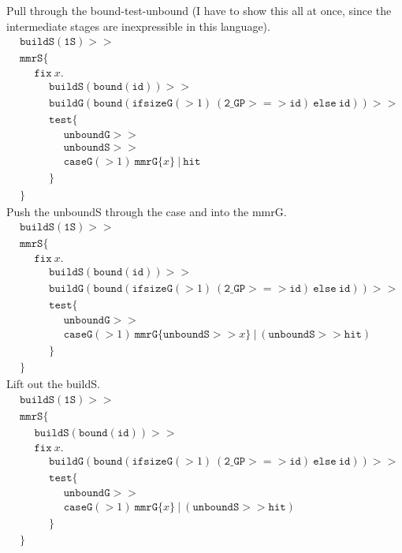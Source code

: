 \documentclass{article}
\newcommand {\fix}{\mathtt{fix}}
\newcommand {\test}{\mathtt{test}}
\newcommand {\isect}{\mathtt{hit}}
\newcommand {\buildG}{\mathtt{buildG}}
\newcommand {\buildS}{\mathtt{buildS}}
\newcommand {\id}{\mathtt{id}}
\newcommand {\unboundG}{\mathtt{unboundG}}
\newcommand {\unboundS}{\mathtt{unboundS}}
\newcommand {\mmrG}{\mathtt{mmrG}}
\newcommand {\mmrS}{\mathtt{mmrS}}
\newcommand {\oneS}{\mathtt{1S}}
\newcommand {\twoGP}{\mathtt{2\_GP}}
\newcommand {\bound}{\mathtt{bound}}
\newcommand {\tab}{~~~~~~}
\begin{document}
Pull through the bound-test-unbound (I have to show this all at once, since the intermediate stages are inexpressible in this language).
\begin{align*}
&\buildS (\oneS) >> \\
&\mmrS \{ \\
&\tab\fix~x. \\
&\tab\tab \buildS(\bound (\mathtt{id})) >> \\
&\tab\tab \buildG (\bound(\mathtt{ifsizeG}(>1)~(\twoGP >=> \id)~\mathtt{else}~\id)) >> \\
&\tab\tab\test \{ \\
&\tab\tab\tab \unboundG >> \\
&\tab\tab\tab \unboundS >> \\
&\tab\tab\tab \mathtt{caseG}(>1)~\mmrG \{x\}~|~\isect\\
&\tab \tab \} \\
&\}
\end{align*}
Push the unboundS through the case and into the mmrG.
\begin{align*}
&\buildS (\oneS) >> \\
&\mmrS \{ \\
&\tab\fix~x. \\
&\tab\tab \buildS(\bound (\mathtt{id})) >> \\
&\tab\tab \buildG (\bound(\mathtt{ifsizeG}(>1)~(\twoGP >=> \id)~\mathtt{else}~\id)) >> \\
&\tab\tab\test \{ \\
&\tab\tab\tab \unboundG >> \\
&\tab\tab\tab \mathtt{caseG}(>1)~\mmrG \{\unboundS >> x\}~|~(\unboundS >> \isect)\\
&\tab \tab \} \\
&\}
\end{align*}
Lift out the buildS.
\begin{align*}
&\buildS (\oneS) >> \\
&\mmrS \{ \\
&\tab \buildS(\bound (\mathtt{id})) >> \\
&\tab\fix~x. \\
&\tab\tab \buildG (\bound(\mathtt{ifsizeG}(>1)~(\twoGP >=> \id)~\mathtt{else}~\id)) >> \\
&\tab\tab\test \{ \\
&\tab\tab\tab \unboundG >> \\
&\tab\tab\tab \mathtt{caseG}(>1)~\mmrG \{x\}~|~(\unboundS >> \isect)\\
&\tab \tab \} \\
&\}
\end{align*}
\end{document}
